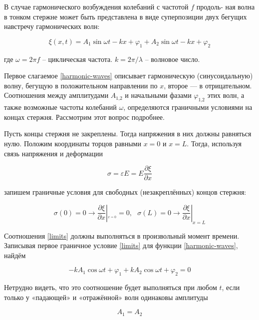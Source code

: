 \documentclass[a4paper,12pt]{article}
\begin{document}
В случае гармонического возбуждения колебаний с частотой $f$ продоль-
ная волна в тонком стержне может быть представлена в виде суперпозиции
двух бегущих навстречу гармонических волн:

\begin{equation}\label{harmonic-waves}
    \xi(x, t) = A_1 \sin{\omega t - kx + \varphi_1} + A_2 \sin{\omega t - kx + \varphi_2}
\end{equation}

где $\omega = 2 \pi f$ -- циклическая частота. $k = 2 \pi / \lambda$ -- волновое число.


Первое слагаемое \eqref{harmonic-waves} описывает гармоническую (синусоидальную) волну, бегущую в положительном направлении по $x$, второе — в отрицательном. Соотношения между амплитудами $A_\text{1,2}$ и начальными фазами $\varphi_\text{1,2}$ этих волн, а также возможные частоты колебаний $\omega$, определяются граничными условиями на концах стержня. Рассмотрим этот вопрос подробнее.


Пусть концы стержня не закреплены. Тогда напряжения в них должны равняться нулю. Положим координаты торцов равными $x = 0$ и $x = L$. Тогда, используя связь напряжения и деформации 

\begin{equation}
    \sigma = \varepsilon E = E \frac{\partial \xi}{\partial x}
\end{equation}

запишем граничные условия для свободных (незакреплённых) концов стержня:

\begin{equation}\label{limits}
    \sigma(0) = 0 \longrightarrow \frac{\partial \xi}{\partial x} \left |_{_{x = 0}} = 0, \ \ \ \sigma(L) = 0 \longrightarrow \frac{\partial \xi}{\partial x} \right |_{x = L}
\end{equation}

Соотношения \eqref{limits} должны выполняться в произвольный момент времени. Записывая первое граничное условие \eqref{limits} для функции \eqref{harmonic-waves}, найдём

\begin{equation}
    -k A_1 \cos{\omega t + \varphi_1} + k A_2 \cos{\omega t + \varphi_2} = 0
\end{equation}

Нетрудно видеть, что это соотношение будет выполняться при любом $t$, если только у «падающей» и «отражённой» волн одинаковы амплитуды

\begin{equation}\label{same-amp}
    A_1 = A_2
\end{equation}
\end{document}
